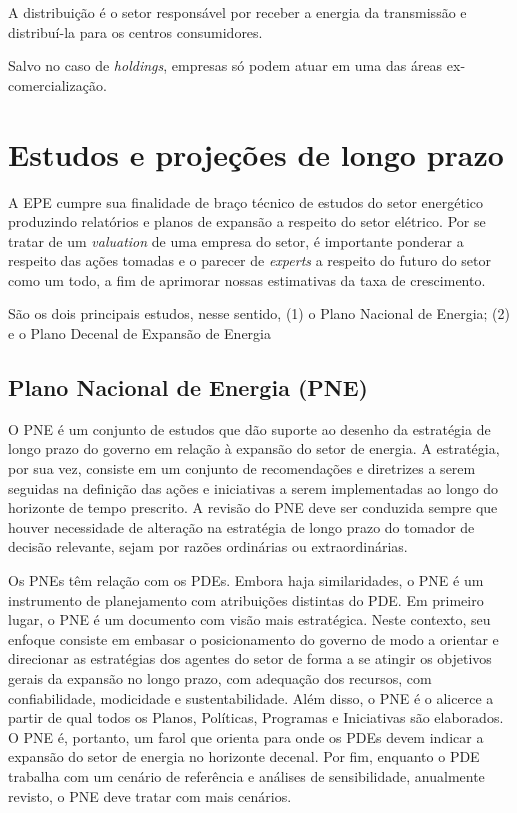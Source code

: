 \documentclass[grad,numbers]{coppe}
\begin{document}
  A distribuição é o setor responsável por receber a energia da transmissão e distribuí-la para os centros consumidores.

  Salvo no caso de \emph{holdings}, empresas só podem atuar em uma das áreas ex-comercialização.

  \hypertarget{estudos-e-projeuxe7uxf5es-de-longo-prazo}{%
  \section{Estudos e projeções de longo prazo}\label{estudos-e-projeuxe7uxf5es-de-longo-prazo}}

  A EPE cumpre sua finalidade de braço técnico de estudos do setor energético produzindo relatórios e planos de expansão a respeito do setor elétrico. Por se tratar de um \emph{valuation} de uma empresa do setor, é importante ponderar a respeito das ações tomadas e o parecer de \emph{experts} a respeito do futuro do setor como um todo, a fim de aprimorar nossas estimativas da taxa de crescimento.

  São os dois principais estudos, nesse sentido, (1) o Plano Nacional de Energia; (2) e o Plano Decenal de Expansão de Energia

  \hypertarget{plano-nacional-de-energia-pne}{%
  \subsection{Plano Nacional de Energia (PNE)}\label{plano-nacional-de-energia-pne}}

  O PNE é um conjunto de estudos que dão suporte ao desenho da estratégia de longo prazo do governo em relação à expansão do setor de energia. A estratégia, por sua vez, consiste em um conjunto de recomendações e diretrizes a serem seguidas na definição das ações e iniciativas a serem implementadas ao longo do horizonte de tempo prescrito. A revisão do PNE deve ser conduzida sempre que houver necessidade de alteração na estratégia de longo prazo do tomador de decisão relevante, sejam por razões ordinárias ou extraordinárias.

  Os PNEs têm relação com os PDEs. Embora haja similaridades, o PNE é um instrumento de planejamento com atribuições distintas do PDE. Em primeiro lugar, o PNE é um documento com visão mais estratégica. Neste contexto, seu enfoque consiste em embasar o posicionamento do governo de modo a orientar e direcionar as estratégias dos agentes do setor de forma a se atingir os objetivos gerais da expansão no longo prazo, com adequação dos recursos, com confiabilidade, modicidade e sustentabilidade. Além disso, o PNE é o alicerce a partir de qual todos os Planos, Políticas, Programas e Iniciativas são elaborados. O PNE é, portanto, um farol que orienta para onde os PDEs devem indicar a expansão do setor de energia no horizonte decenal. Por fim, enquanto o PDE trabalha com um cenário de referência e análises de sensibilidade, anualmente revisto, o PNE deve tratar com mais cenários.
\end{document}
